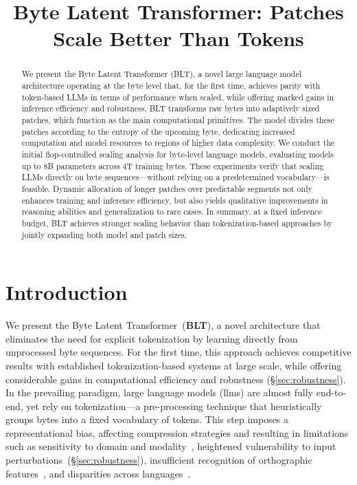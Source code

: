 \title{Byte Latent Transformer: Patches Scale Better Than Tokens}

\begin{abstract}
We present the Byte Latent Transformer ({\textsc BLT}), a novel large language model architecture operating at the byte level that, for the first time, achieves parity with token-based LLMs in terms of performance when scaled, while offering marked gains in inference efficiency and robustness.
{\textsc BLT} transforms raw bytes into adaptively sized patches, which function as the main computational primitives. The model divides these patches according to the entropy of the upcoming byte, dedicating increased computation and model resources to regions of higher data complexity. We conduct the initial flop-controlled scaling analysis for byte-level language models, evaluating models up to 8B parameters across 4T training bytes. These experiments verify that scaling LLMs directly on byte sequences—without relying on a predetermined vocabulary—is feasible. Dynamic allocation of longer patches over predictable segments not only enhances training and inference efficiency, but also yields qualitative improvements in reasoning abilities and generalization to rare cases. In summary, at a fixed inference budget, {\textsc BLT} achieves stronger scaling behavior than tokenization-based approaches by jointly expanding both model and patch sizes.
\end{abstract}

\section{Introduction}
\label{section:intro}

We present the Byte Latent Transformer~(\textbf{BLT}), a novel architecture that eliminates the need for explicit tokenization by learning directly from unprocessed byte sequences. For the first time, this approach achieves competitive results with established tokenization-based systems at large scale, while offering considerable gains in computational efficiency and robustness (\S\ref{sec:robustness}). In the prevailing paradigm, large language models (llms) are almost fully end-to-end, yet rely on tokenization—a pre-processing technique that heuristically groups bytes into a fixed vocabulary of tokens. This step imposes a representational bias, affecting compression strategies and resulting in limitations such as sensitivity to domain and modality~\citep{dagangetting}, heightened vulnerability to input perturbations~(\S\ref{sec:robustness}), insufficient recognition of orthographic features~\citep{edman2024cute}, and disparities across languages~\citep{liang2023xlm,petrov2024language,limisiewicz2024myte}.

